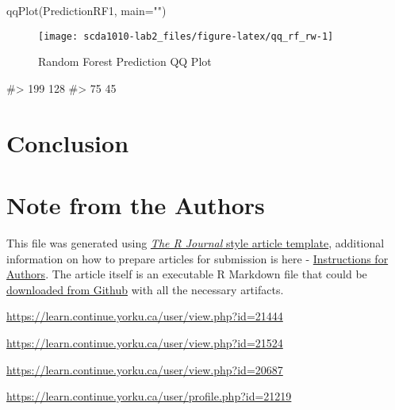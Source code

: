 \begin{Schunk}
\begin{Sinput}
qqPlot(PredictionRF1, main="")
\end{Sinput}
\begin{figure}[h]

{\centering \texttt{[image: scda1010-lab2\_files/figure-latex/qq\_rf\_rw-1]} 

}

\caption[Random Forest Prediction QQ Plot]{Random Forest Prediction QQ Plot}\label{fig:qq_rf_rw}
\end{figure}
\begin{Soutput}
#> 199 128 
#>  75  45
\end{Soutput}
\end{Schunk}

\newpage

\hypertarget{conclusion}{%
\section{Conclusion}\label{conclusion}}



\newpage

\hypertarget{note-from-the-authors}{%
\section{Note from the Authors}\label{note-from-the-authors}}

This file was generated using
\href{https://github.com/rstudio/rticles}{\emph{The R Journal} style
article template}, additional information on how to prepare articles for
submission is here -
\href{https://journal.r-project.org/share/author-guide.pdf}{Instructions
for Authors}. The article itself is an executable R Markdown file that
could be
\href{https://github.com/ivbsoftware/scda1010-lab1/tree/master/docs/R_Journal/csda1010-lab1lab1}{downloaded
from Github} with all the necessary artifacts.


\address{%
Viviane Adohouannon\\
York University School of Continuing Studies\\
\\
}
\url{https://learn.continue.yorku.ca/user/view.php?id=21444}

\address{%
Kate Alexander\\
York University School of Continuing Studies\\
\\
}
\url{https://learn.continue.yorku.ca/user/view.php?id=21524}

\address{%
Diana Azbel\\
York University School of Continuing Studies\\
\\
}
\url{https://learn.continue.yorku.ca/user/view.php?id=20687}

\address{%
Igor Baranov\\
York University School of Continuing Studies\\
\\
}
\url{https://learn.continue.yorku.ca/user/profile.php?id=21219}

